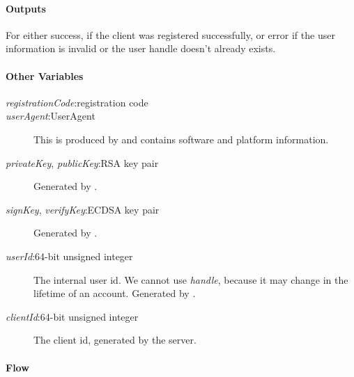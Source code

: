 \documentclass[a4paper,10pt,draft]{article}
\newcommand{\handle}{\emph{handle}}
\newcommand{\registrationCode}{\emph{registrationCode}}
\newcommand{\userAgent}{\emph{userAgent}}
\newcommand{\privateKey}{\emph{privateKey}}
\newcommand{\publicKey}{\emph{publicKey}}
\newcommand{\signKey}{\emph{signKey}}
\newcommand{\verifyKey}{\emph{verifyKey}}
\newcommand{\userId}{\emph{userId}}
\newcommand{\clientId}{\emph{clientId}}
\begin{document}
\paragraph{Outputs}
For \Client{} either success, if the client was registered successfully, or error if the user information is invalid or the user handle doesn't already exists.

\paragraph{Other Variables}
\SpecialItem
\begin{description}
 \item[\registrationCode{}:registration code]
 \item[\userAgent{}:UserAgent] This is produced by \Client{} and contains software and platform information.
 \item[\privateKey{}, \publicKey{}:RSA key pair] Generated by \Client{}.
 \item[\signKey{}, \verifyKey{}:ECDSA key pair] Generated by \Client{}.
 \item[\userId{}:64-bit unsigned integer] The internal user id. We cannot use \handle{}, because it may change in the lifetime of an account. Generated by \Server{}.
 \item[\clientId{}:64-bit unsigned integer] The client id, generated by the server.
\end{description}

\paragraph{Flow}
\end{document}
